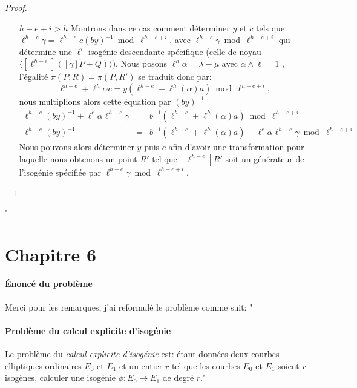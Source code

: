 \documentclass[10pt,a4paper]{article}
\theoremstyle{plain}
\theoremstyle{definition}
\theoremstyle{definition}
\theoremstyle{definition}
\theoremstyle{definition}
\theoremstyle{definition}
\theoremstyle{remark}
\theoremstyle{remark}
\theoremstyle{definition}
\begin{document}
{\begin{proof}
\begin{itemize}
\item[$h-e+i>h$] %
Montrons dans ce cas comment déterminer
$y$ et $c$  tels que $\ell^{h-e}\gamma=\ell^{h-e}c(by)^{-1} \bmod 
\ell^{h-e+i}$, avec $\ell^{h-e}\gamma \bmod \ell^{h-e+i}$ qui détermine une 
$\ell^i$-isogénie descendante spécifique (celle de noyau $\langle [\ell^{h-e}]
([\gamma]P+Q) \rangle$). %
Nous posons $\ell^{h} \alpha = \lambda - \mu$ avec $\alpha \wedge \ell=1$
, l'égalité $\pi(P,R)=\pi(P,R')$ se traduit donc par:
\[  \ell^{h-e} + \ell^{h}\alpha c=y( \ell^{h-e}+\ell^{h}(\alpha)a) \bmod \ell^{h-e+i}, \]
nous multiplions alors cette équation par $(by)^{-1}$
\begin{eqnarray*}
 \ell^{h-e}(by)^{-1} + \ell^{e}\alpha \ell^{h-e} \gamma &=& b^{-1}( \ell^{h-e}+\ell^{h}(\alpha)a) \bmod \ell^{h-e+i} \\
\ell^{h-e}(by)^{-1} &=&  b^{-1}(\ell^{h-e}+\ell^{h}(\alpha)a) - \ell^{e}\alpha \ell^{h-e} \gamma \bmod \ell^{h-e+i} 
\end{eqnarray*}
Nous pouvons alors déterminer $y$ puis $c$ afin d'avoir une transformation pour 
laquelle nous obtenons un point $R'$ tel que $[\ell^{h-e}]R'$ soit un générateur 
de l'isogénie spécifiée par $\ell^{h-e}\gamma \bmod \ell^{h-e+i}$.
\end{itemize}
\end{proof}
"}

\section{Chapitre 6}

\paragraph{Énoncé du problème}{Merci pour les remarques, j'ai reformulé le problème comme suit: 
"\paragraph{Problème du calcul explicite d'isogénie} \label{prob:isogeny-problem}

Le problème du \emph{calcul explicite d'isogénie} est: étant données deux 
courbes elliptiques ordinaires $E_0$ et $E_1$ et un entier $r$ tel que les 
courbes $E_0$ et $E_1$ soient $r$-isogènes, calculer une isogénie $\phi:E_0 
\rightarrow E_1$ de degré $r$."}
\end{document}
